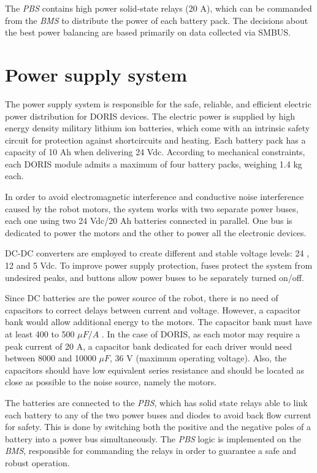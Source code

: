\documentclass{ifacconf}
\begin{document}
The \emph{PBS} contains high power solid-state relays (20 A), which can be
commanded from the \emph{BMS} to distribute the power of each battery pack.
The decisions about the best power balancing are based primarily on data
collected via SMBUS.

\section{Power supply system}\label{sec:powersupply_overview}
The power supply system is responsible for the safe, reliable, and efficient
electric power distribution for DORIS devices. The electric power is supplied by
high energy density military lithium ion batteries, which come with an intrinsic
safety circuit for protection against shortcircuits and heating. Each battery
pack has a capacity of 10 Ah when delivering 24 Vdc. According to mechanical
constraints, each DORIS module admits a maximum of four battery packs, weighing
1.4 kg each.

In order to avoid electromagnetic interference and conductive noise interference
caused by the robot motors, the system works with two separate power buses, each
one using two 24 Vdc/20 Ah batteries connected in parallel. One bus is
dedicated to power the motors and the other to power all the electronic
devices.

DC-DC converters are employed to create different and stable voltage levels: 24
, 12 and 5 Vdc. To improve power supply protection, fuses protect the system
from undesired peaks, and buttons allow power buses to be separately turned on/off.

Since DC batteries are the power source of the robot, there is no need of
capacitors to correct delays between current and voltage. However, a capacitor
bank would allow additional energy to the motors. The capacitor bank must have
at least 400 to 500  $\mu F/A$ \citep{capacitor}. In the case of DORIS, as each
motor may require a peak current of 20 A, a capacitor bank dedicated for each
driver would need between 8000 and 10000 $\mu F$, 36 V (maximum operating
voltage). Also, the capacitors should have low equivalent series resistance and
should be located as close as possible to the noise source, namely the
motors. 

The batteries are connected to the \emph{PBS}, which has solid state relays
able to link each battery to any of the two power buses and diodes to avoid back
flow current for safety. This is done by switching both the positive and the
negative poles of a battery into a power bus simultaneously. The \emph{PBS}
logic is implemented on the \emph{BMS}, responsible for commanding the
relays in order to guarantee a safe and robust operation.
\end{document}
